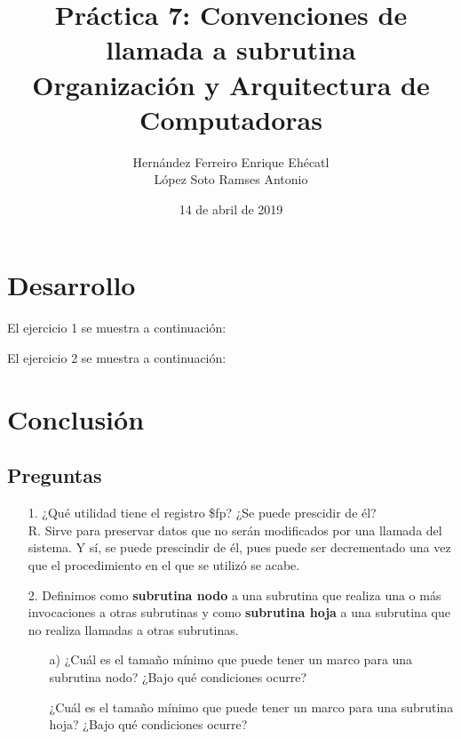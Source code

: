 \documentclass[12pt, letterpaper]{article}
\author{Hernández Ferreiro Enrique Ehécatl \\
          López Soto Ramses Antonio}
\title{Práctica 7: Convenciones de llamada a subrutina \\
                {\small Organización y Arquitectura de Computadoras}}
\date{14 de abril de 2019}
\begin{document}
  \maketitle
  \section{Desarrollo}
  El ejercicio 1 se muestra a continuación:\vspace{.1cm}

  \vspace{.3cm}

  El ejercicio 2 se muestra a continuación:\vspace{.1cm}

  \vspace{.3cm}

  \section{Conclusión}
  \subsection{Preguntas}
  \begin{itemize}
      \item[1.] ¿Qué utilidad tiene el registro \$fp? ¿Se puede prescidir de él? \\
                R. Sirve para preservar datos que no serán modificados por una llamada del sistema.
                Y sí, se puede prescindir de él, pues puede ser decrementado una vez que el procedimiento
                en el que se utilizó se acabe.
      \item[2.] Definimos como \textbf{subrutina nodo} a una subrutina que realiza
                una o más invocaciones a otras subrutinas y como \textbf{subrutina hoja}
                a una subrutina que no realiza llamadas a otras subrutinas.
                \begin{itemize}
                    \item[a)]   ¿Cuál es el tamaño mínimo que puede tener un marco para
                                una subrutina nodo? ¿Bajo qué condiciones ocurre?
                    \item[]     ¿Cuál es el tamaño mínimo que puede tener un marco para
                                una subrutina hoja? ¿Bajo qué condiciones ocurre?
                \end{itemize}
      \item[]
  \end{itemize}
  
\end{document}
